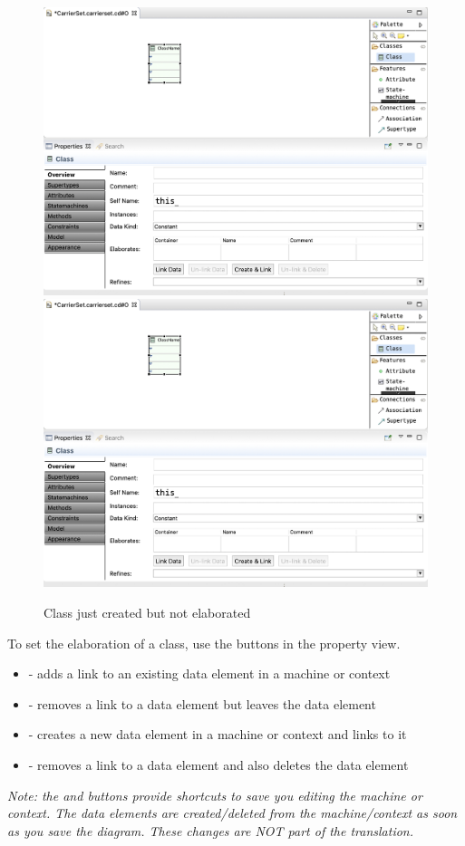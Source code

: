 \begin{figure}[!htbp]
	\centering
	\ifplastex
	\includegraphics[width=1000]{figures/ClassCreation.png}
	\else
	\includegraphics[width=1\textwidth]{figures/ClassCreation.png}
	\fi
	\caption{Class just created but not elaborated}
	\label{fig:ClassCreation}
\end{figure}

To set the elaboration of a class, use the buttons in the property view.
\begin{itemize}
	\item {} - adds a link to an existing data element in a machine or context
	\item {} - removes a link to a data element but leaves the data element
	\item {} - creates a new data element in a machine or context and links to it
	\item {} - removes a link to a data element and also deletes the data element
\end{itemize}
\emph{Note: the  and  buttons provide shortcuts to save you editing the machine or context. 
	The data elements are created/deleted from the machine/context as soon as you save the diagram. 
	These changes are NOT part of the translation.}

